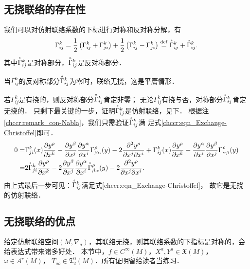 \subsection{无挠联络的存在性}\label{chccr:sec_no-torsion}

我们可以对仿射联络系数的下标进行对称和反对称分解，有
\begin{equation}
	\Gamma^k_{ij} = \frac{1}{2}\left(\Gamma^k_{ij} + \Gamma^k_{ji}\right)
	+\frac{1}{2}\left(\Gamma^k_{ij} - \Gamma^k_{ji}\right)
	\overset{\mathrm {def}}{=} \oversetmy{s}{\Gamma}^k_{ij} + \oversetmy{a}{\Gamma}^k_{ij}.
\end{equation}
其中$\oversetmy{s}{\Gamma}^k_{ij}$是对称部分，$\oversetmy{a}{\Gamma}^k_{ij}$是反对称部分．

当$\Gamma^k_{ij}$的反对称部分$\oversetmy{a}{\Gamma}^k_{ij}$为零时，联络无挠，这是平庸情形．

若$\Gamma^k_{ij}$是有挠的，则反对称部分$\oversetmy{a}{\Gamma}^k_{ij}$肯定非零；
无论$\Gamma^k_{ij}$有挠与否，对称部分$\oversetmy{s}{\Gamma}^k_{ij}$肯定无挠的．
只剩下最关键的一步，证明$\oversetmy{s}{\Gamma}^k_{ij}$是仿射联络，见下．
根据注\ref{chccr:remark_con-Nabla}，我们只需验证$\oversetmy{s}{\Gamma}^k_{ij}$满
足式\eqref{chccr:eqn_Exchange-Christoffel}即可．
\begin{align*}
		0 = & \Gamma^{k}_{ji}(x) \frac{\partial y^\rho}{\partial x^k} -
		\frac{\partial y^\beta}{\partial x^j} \frac{\partial y^\alpha}{\partial x^i}
		\Gamma^{\rho}_{\beta\alpha}(y) -2 \frac{\partial^2 y^\rho}{\partial x^j \partial x^i}
		+\Gamma^{k}_{ij}(x) \frac{\partial y^\rho}{\partial x^k} -
		\frac{\partial y^\alpha}{\partial x^i} \frac{\partial y^\beta}{\partial x^j}
		\Gamma^{\rho}_{\alpha\beta}(y)  \\
		=& 2\oversetmy{s}{\Gamma}^k_{ji}  \frac{\partial y^\rho}{\partial x^k}
		-2\frac{\partial y^\beta}{\partial x^j} \frac{\partial y^\alpha}{\partial x^i}
		\oversetmy{s}{\Gamma}^{\rho}_{\beta\alpha}(y) 
		- 2\frac{\partial^2 y^\rho}{\partial x^j \partial x^i} .
\end{align*}
由上式最后一步可见：$\oversetmy{s}{\Gamma}^k_{ij}$满足式\eqref{chccr:eqn_Exchange-Christoffel}，
故它是无挠的仿射联络．







\subsection{无挠联络的优点}\label{chccr:sec_eqn-Nalba}
给定仿射联络空间$(M,\nabla_a)$，其联络无挠，则其联络系数的下指标是对称的，会给表达式带来诸多好处．
本节中，$f\in C^\infty(M)$，$X^a,Y^a\in \mathfrak{X}(M)$，$\omega \in A^r(M)$，
$T_{ab} \in \mathfrak{T}^0_2(M)$．所有证明留给读者当练习．

